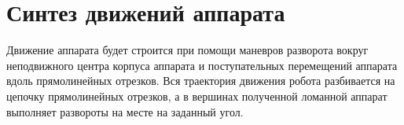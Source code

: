 
\section{Синтез движений аппарата}
Движение аппарата будет строится при помощи маневров разворота вокруг неподвижного центра корпуса аппарата и поступательных перемещений аппарата вдоль прямолинейных отрезков. Вся траектория движения робота разбивается на цепочку прямолинейных отрезков, а в вершинах полученной ломанной аппарат выполняет развороты на месте на заданный угол.

